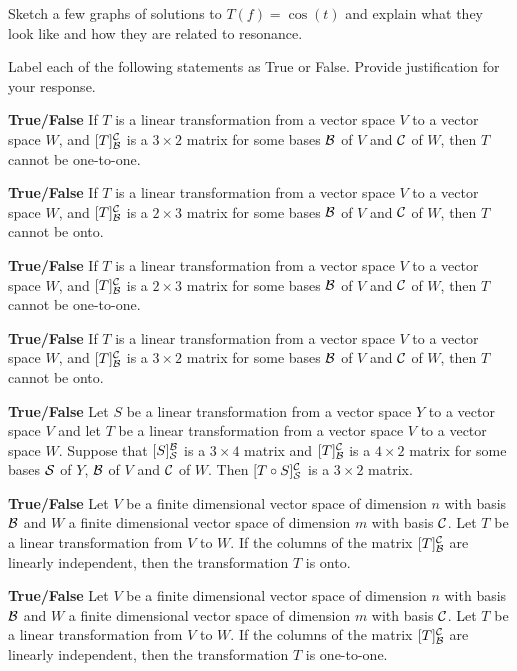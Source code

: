 	\item Sketch a few graphs of solutions to $T(f) = \cos(t)$ and explain what they look like and how they are related to resonance. 
	

	\ea

 \item Label each of the following statements as True or False. Provide justification for your response.
\ba	
\item \textbf{True/False} If $T$ is a linear transformation from a vector space $V$ to a vector space $W$, and $[T]_{\mathcal{B}}^{\mathcal{C}}$ is a $3 \times 2$ matrix for some bases $\mathcal{B}$ of $V$ and $\mathcal{C}$ of $W$, then $T$ cannot be one-to-one.  

\item \textbf{True/False} If $T$ is a linear transformation from a vector space $V$ to a vector space $W$, and $[T]_{\mathcal{B}}^{\mathcal{C}}$ is a $2 \times 3$ matrix for some bases $\mathcal{B}$ of $V$ and $\mathcal{C}$ of $W$, then $T$ cannot be onto.  

\item \textbf{True/False} If $T$ is a linear transformation from a vector space $V$ to a vector space $W$, and $[T]_{\mathcal{B}}^{\mathcal{C}}$ is a $2 \times 3$ matrix for some bases $\mathcal{B}$ of $V$ and $\mathcal{C}$ of $W$, then $T$ cannot be one-to-one.  

\item \textbf{True/False} If $T$ is a linear transformation from a vector space $V$ to a vector space $W$, and $[T]_{\mathcal{B}}^{\mathcal{C}}$ is a $3 \times 2$ matrix for some bases $\mathcal{B}$ of $V$ and $\mathcal{C}$ of $W$, then $T$ cannot be onto.  

\item \textbf{True/False} Let $S$ be a linear transformation from a vector space $Y$ to a vector space $V$ and let $T$ be a linear transformation from a vector space $V$ to a vector space $W$. Suppose that $[S]_{\mathcal{S}}^{\mathcal{B}}$ is a $3 \times 4$ matrix and $[T]_{\mathcal{B}}^{\mathcal{C}}$ is a $4 \times 2$ matrix for some bases $\mathcal{S}$ of $Y$, $\mathcal{B}$ of $V$ and $\mathcal{C}$ of $W$. Then $[T \circ S]_{\mathcal{S}}^{\mathcal{C}}$ is a $3 \times 2$ matrix. 

\item \textbf{True/False} Let $V$ be a finite dimensional vector space of dimension $n$ with basis $\mathcal{B}$ and $W$ a finite dimensional vector space of dimension $m$ with basis $\mathcal{C}$. Let $T$ be a linear transformation from $V$ to $W$. If the columns of the matrix $[T]_{\mathcal{B}}^{\mathcal{C}}$ are linearly independent, then the transformation $T$ is onto.

\item \textbf{True/False}  Let $V$ be a finite dimensional vector space of dimension $n$ with basis $\mathcal{B}$ and $W$ a finite dimensional vector space of dimension $m$ with basis $\mathcal{C}$. Let $T$ be a linear transformation from $V$ to $W$. If the columns of the matrix $[T]_{\mathcal{B}}^{\mathcal{C}}$ are linearly independent, then the transformation $T$ is one-to-one.

